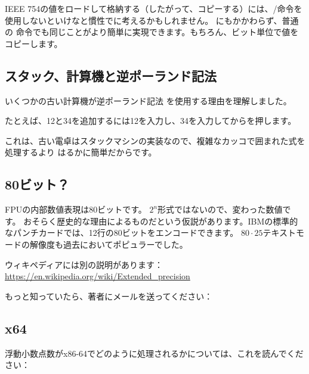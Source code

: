 IEEE 754の値をロードして格納する（したがって、コピーする）には、/命令を使用しないといけなと慣性でに考えるかもしれません。
にもかかわらず、普通の \MOV 命令でも同じことがより簡単に実現できます。もちろん、ビット単位で値をコピーします。

\subsection{スタック、計算機と逆ポーランド記法}


いくつかの古い計算機が逆ポーランド記法
を使用する理由を理解しました。

たとえば、12と34を追加するには12を入力し、34を入力してからを押します。

これは、古い電卓はスタックマシンの実装なので、複雑なカッコで囲まれた式を処理するより
はるかに簡単だからです。


\subsection{80ビット？}

FPUの内部数値表現は80ビットです。
$2^n$形式ではないので、変わった数値です。
おそらく歴史的な理由によるものだという仮説があります。IBMの標準的なパンチカードでは、12行の80ビットをエンコードできます。 
$80\cdot 25$テキストモードの解像度も過去においてポピュラーでした。

ウィキペディアには別の説明があります：\url{https://en.wikipedia.org/wiki/Extended_precision}

もっと知っていたら、著者にメールを送ってください： \EMAILS{}

\subsection{x64}

浮動小数点数がx86-64でどのように処理されるかについては、これを読んでください：


